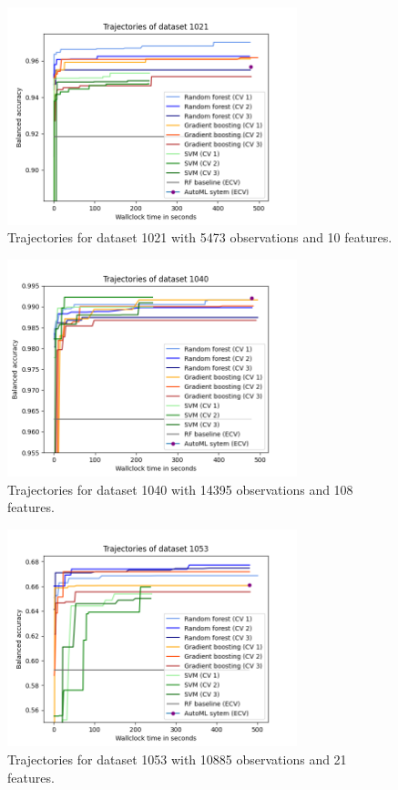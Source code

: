 \documentclass[11pt]{article}
\begin{document}
\begin{figure}[H]
 \centering
  \includegraphics[width=0.75\textwidth]{fig/plot_dataset_1021.png}
  \caption{Trajectories for dataset 1021 with 5473 observations and 10 features.}
\end{figure}

\begin{figure}[H]
 \centering
  \includegraphics[width=0.75\textwidth]{fig/plot_dataset_1040.png}
  \caption{Trajectories for dataset 1040 with 14395 observations and 108 features.}
\end{figure}

\begin{figure}[H]
 \centering
  \includegraphics[width=0.75\textwidth]{fig/plot_dataset_1053.png}
  \caption{Trajectories for dataset 1053 with 10885 observations and 21 features.}
\end{figure}
\end{document}
